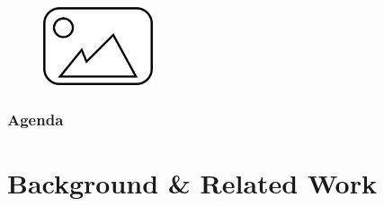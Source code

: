\documentclass[aspectratio=169,10pt]{beamer}
\begin{document}
\begin{frame}
    \begin{figure}
        \centering
        \includegraphics[height=2.3cm]{placeholder.png} %
    \end{figure}
    
\end{frame}

\begin{frame}
    \frametitle{Agenda}
    \tableofcontents
\end{frame}

\section{Background \& Related Work}
\end{document}
